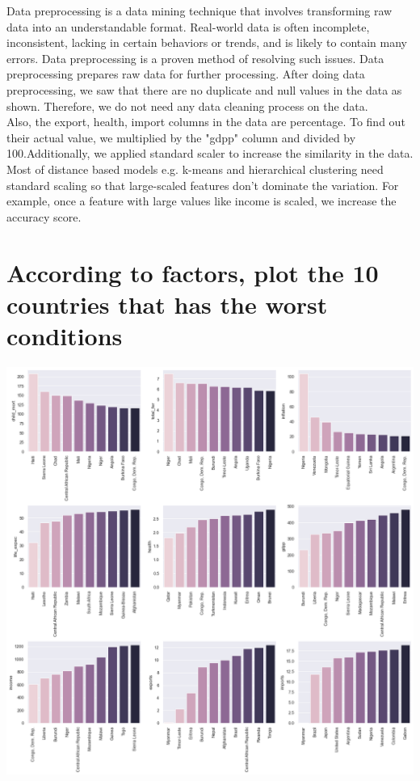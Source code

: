 \documentclass[onecolumn]{article}
\begin{document}
Data preprocessing is a data mining technique that involves transforming raw data into an understandable format. Real-world data is often incomplete, inconsistent, lacking in certain behaviors or trends, and is likely to contain many errors. Data preprocessing is a proven method of resolving such issues. Data preprocessing prepares raw data for further processing.
After doing data preprocessing, we saw that there are no duplicate and null values in the data as shown. Therefore, we do not need any data cleaning process on the data. \\Also, the export, health, import columns in the data are percentage. To find out their actual value, we multiplied by the "gdpp" column and divided by 100.Additionally, we applied standard scaler to increase the similarity in the data. Most of distance based models e.g. k-means and hierarchical clustering need standard scaling so that large-scaled features don't dominate the variation.
For example, once a feature with large values like income is scaled, we increase the accuracy score.
\normalsize
\section{According to factors, plot the 10 countries that has the worst conditions}

\begin{center}
    \includegraphics[height=0.25\textheight]{firsfig.png}
\end{center}
\end{document}

